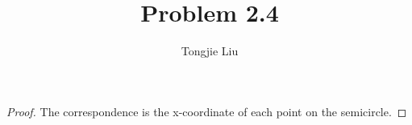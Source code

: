 \documentclass{article}
\title{Problem 2.4}
\author{Tongjie Liu}
\begin{document}
\maketitle


\begin{proof}
	The correspondence is the x-coordinate of each point on the
semicircle.
\end{proof}
\end{document}
